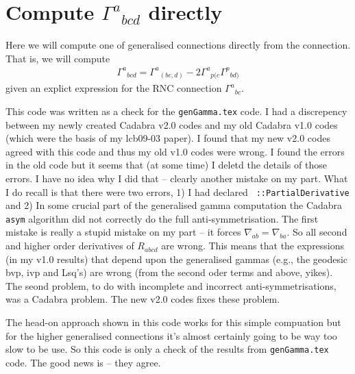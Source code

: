 \documentclass[12pt]{cdblatex}
\begin{document}
\section*{Compute $\Gamma^{a}{}_{bcd}$ directly}

Here we will compute one of generalised connections directly from the connection. That is, we will
compute
\begin{align}
   \Gamma^{a}{}_{bcd} = \Gamma^{a}{}_{(bc,d)} - 2 \Gamma^{a}{}_{p(c} \Gamma^{p}{}_{bd)}
\end{align}
given an explict expression for the RNC connection $\Gamma^{a}{}_{bc}$.

This code was written as a check for the {\tt genGamma.tex} code. I had a discrepency between my
newly created Cadabra v2.0 codes and my old Cadabra v1.0 codes (which were the basis of my
lcb09-03 paper). I found that my new v2.0 codes agreed with this code and thus my old v1.0 codes
were wrong. I found the errors in the old code but it seems that (at some time) I deletd the
details of those errors. I have no idea why I did that -- clearly another mistake on my part.
What I do recall is that there were two errors, 1) I had declared {\tt
\nabla{#}::PartialDerivative} and 2) In some crucial part of the generalised gamma computation
the Cadabra {\tt asym} algorithm did not correctly do the full anti-symmetrisation. The first
mistake is really a stupid mistake on my part -- it forces $\nabla_{ab} = \nabla_{ba}$. So all
second and higher order derivatives of $R_{abcd}$ are wrong. This means that the expressions (in
my v1.0 results) that depend upon the generalised gammas (e.g., the geodesic bvp, ivp and Lsq's)
are wrong (from the second oder terms and above, yikes). The seond problem, to do with incomplete
and incorrect anti-symmetrisations, was a Cadabra problem. The new v2.0 codes fixes these problem.

The head-on approach shown in this code works for this simple compuation but for the higher
generalised connections it's almost certainly going to be way too slow to be use. So this code is
only a check of the results from {\tt genGamma.tex} code. The good news is -- they agree.

\clearpage
\end{document}
